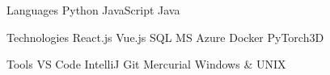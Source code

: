 

\begin{cvskills}

  \cvskill
  {Languages} %
  {
    Python
      {\enskip\cdotp\enskip} JavaScript
      {\enskip\cdotp\enskip} Java
  } %

  \cvskill
  {Technologies} %
  {
    React.js
      {\enskip\cdotp\enskip} Vue.js
      {\enskip\cdotp\enskip} SQL
      {\enskip\cdotp\enskip} MS Azure
      {\enskip\cdotp\enskip} Docker
      {\enskip\cdotp\enskip} PyTorch3D
  } %

  \cvskill
  {Tools} %
  {
    VS Code
      {\enskip\cdotp\enskip} IntelliJ
      {\enskip\cdotp\enskip} Git
      {\enskip\cdotp\enskip} Mercurial
      {\enskip\cdotp\enskip} Windows \& UNIX
  } %


\end{cvskills}
